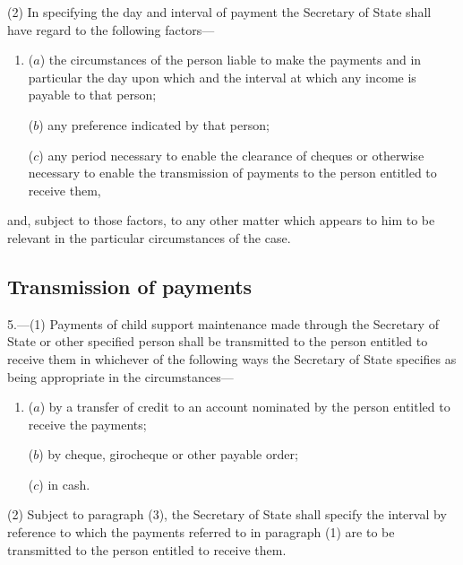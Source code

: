 \documentclass[12pt,a4paper]{article}
\begin{document}
(2) In specifying the day and interval of payment the Secretary of State shall have regard to the following factors—
\begin{enumerate}\item[]
($a$) the circumstances of the person liable to make the payments and in particular the day upon which and the interval at which any income is payable to that person;

($b$) any preference indicated by that person;

($c$) any period necessary to enable the clearance of cheques or otherwise necessary to enable the transmission of payments to the person entitled to receive them,
\end{enumerate}
and, subject to those factors, to any other matter which appears to him to be relevant in the particular circumstances of the case.


\subsection[5. Transmission of payments]{Transmission of payments}

5.—(1) Payments of child support maintenance made through the Secretary of State or other specified person shall be transmitted to the person entitled to receive them in whichever of the following ways the Secretary of State specifies as being appropriate in the circumstances—
\begin{enumerate}\item[]
($a$) by a transfer of credit to an account nominated by the person entitled to receive the payments;

($b$) by cheque, girocheque or other payable order;

($c$) in cash.
\end{enumerate}

(2) 
Subject to paragraph (3), the Secretary of State  %
shall specify the interval by reference to which the payments referred to in paragraph (1) are to be transmitted to the person entitled to receive them.

%
%
\end{document}
